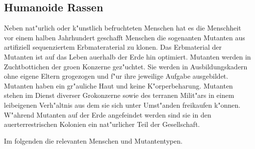 \begin{appendices}

\section{Humanoide Rassen}

Neben nat"urlich oder k"unstlich befruchteten Menschen hat es die Menschheit vor einem halben Jahrhundert geschafft Menschen die sogenanten Mutanten aus artifiziell sequenziertem Erbmateraterial zu klonen. Das Erbmaterial der Mutanten ist auf das Leben au\3erhalb der Erde hin optimiert. Mutanten werden in Zuchtbottichen der gro\3en Konzerne gez"uchtet. Sie werden in Ausbildungskadern ohne eigene Eltern gro\3gezogen und f"ur ihre jeweilige Aufgabe ausgebildet. Mutanten haben ein gr"auliche Haut und keine K"orperbeharung. Mutanten stehen im Dienst diverser Gro\3konzerne sowie des terranen Milit"ars in einem leibeigenen Verh"altnis aus dem sie sich unter Umst"anden freikaufen k"onnen. W"ahrend Mutanten auf der Erde angefeindet werden sind sie in den au\3erterrestrischen Kolonien ein nat"urlicher Teil der Gesellschaft.

Im folgenden die relevanten Menschen und Mutantentypen.


\end{appendices}
